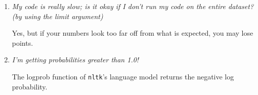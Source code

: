 \documentclass[11pt]{article}
\begin{document}
\begin{enumerate}

\item \textit{My code is really slow; is it okay if I don't run my code on the entire dataset?  (by using the limit argument)}

Yes, but if your numbers look too far off from what is expected, you may lose points.

\item \textit{I'm getting probabilities greater than 1.0!}

The logprob function of \texttt{nltk}'s language model returns the negative log probability.

\end{enumerate}
\end{document}
